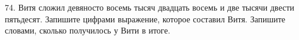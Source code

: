 74. Витя сложил девяносто восемь тысяч двадцать восемь и две тысячи двести пятьдесят. Запишите цифрами выражение, которое составил Витя. Запишите словами, сколько получилось у Вити в итоге.\\
